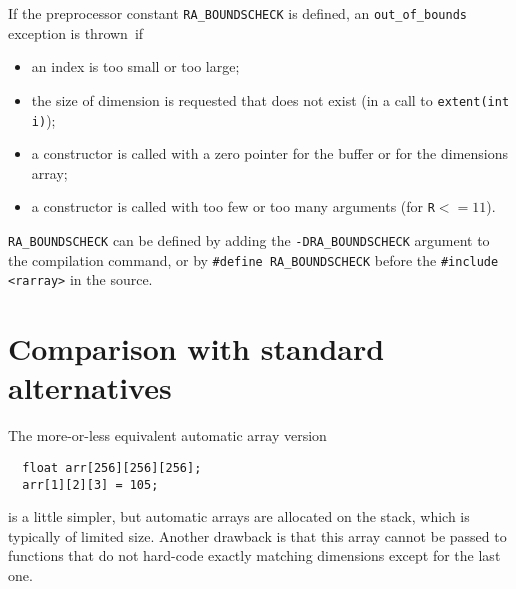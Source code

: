\documentclass[11pt,twoside]{article}
\begin{document}
If the preprocessor constant \texttt{{\tt RA\_BOUNDSCHECK}} is defined, an
\texttt{out\_of\_bounds} exception is thrown~if
\begin{itemize}\itemsep0pt\parskip3pt
\item an index is too small or too large;
\item the size of dimension is requested that does not exist (in a call to \texttt{extent(int i)});
\item a constructor is called with a zero pointer for the buffer or for the dimensions array;
\item a constructor is called with too few or too many arguments (for \texttt{R}$<=11$).
\end{itemize}
\texttt{{\tt RA\_BOUNDSCHECK}} can be defined by
adding the {\tt -DRA\_BOUNDSCHECK} argument to the compilation command, or
by \texttt{{\tt\#define RA\_BOUNDSCHECK}} before
the \texttt{{\tt\#include <rarray>}} in the source.

\pagebreak

\section{Comparison with standard alternatives}

The more-or-less equivalent automatic array version 

\vspace{-5pt}\begin{framed}\vspace{-14pt}%
\begin{verbatim}
  float arr[256][256][256]; 
  arr[1][2][3] = 105;
\end{verbatim}
\vspace{-14pt}\end{framed}
\noindent
is a little simpler, but automatic arrays are allocated on the stack,
which is typically of limited size. Another drawback is that this array cannot be passed to functions that do
not hard-code exactly matching dimensions except for the last
one.
\end{document}
